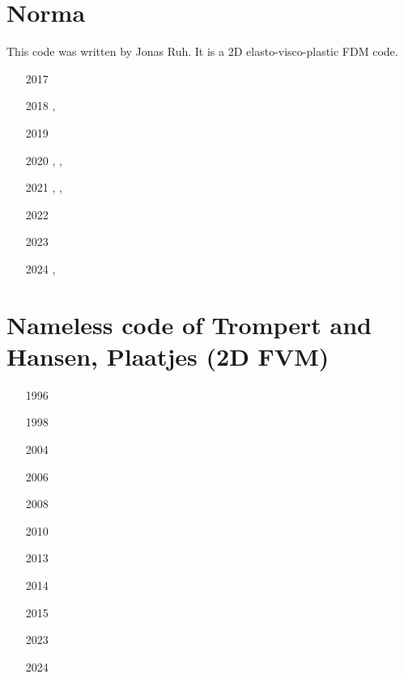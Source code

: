 \section{Norma}

This code was written by Jonas Ruh. It is a 2D elasto-visco-plastic FDM code.

\begin{small}
\begin{itemize}
\item[2017] \textcite{ruh_17}
\item[2018] \textcite{ruvb18}, \textcite{ruve18}
\item[2019] \textcite{grru19}
\item[2020] \textcite{herv20}, \textcite{dara20}, \textcite{ruh20}
\item[2021] \textcite{nabr21}, \textcite{grrs21}, \textcite{raru21}
\item[2022] \textcite{rutb22}
\item[2023] \textcite{naru23}
\item[2024] \textcite{rubt24}, \textcite{gorn24}
\end{itemize}
\end{small}




\section{Nameless code of Trompert and Hansen, Plaatjes (2D FVM)}

\begin{small}
\begin{itemize}
\item[1996]
\textcite{trha96}
\item[1998]
\textcite{trha98}\textcite{trha98b}
\item[2004]
\textcite{goch04}
\item[2006]
\textcite{losh06}
\item[2008]
\textcite{loha08}\textcite{stha08}
\item[2010]
\textcite{stfh10}
\item[2013]
\textcite{stlh13}
\textcite{stha13}
\item[2014]
\textcite{stha14}
\item[2015]
\textcite{tosn15}
\item[2023]
\textcite{stha23}
\item[2024]
\textcite{stha24}
\end{itemize}
\end{small} 



